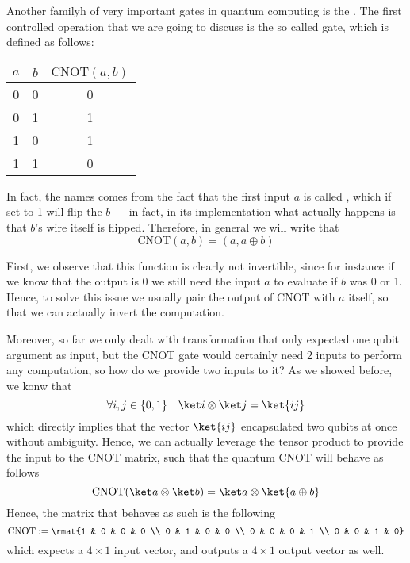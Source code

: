\documentclass[a4paper, 12pt]{report}
\begin{document}
Another familyh of very important gates in quantum computing is the . The first controlled operation that we are going to discuss is the so called  gate, which is defined as follows:

\begin{center}
	\begin{tabular}{cc|c}
		\hline
		$a$ & $b$ & $\mbox{CNOT}(a, b)$ \\
		\hline\hline
		0   & 0   & 0                   \\
		\hline
		0   & 1   & 1                   \\
		\hline
		1   & 0   & 1                   \\
		\hline
		1   & 1   & 0                   \\
		\hline
	\end{tabular}
\end{center}

In fact, the names comes from the fact that the first input $a$ is called , which if set to 1 will flip the  $b$ --- in fact, in its implementation what actually happens is that $b$'s wire itself is flipped. Therefore, in general we will write that $$\mbox{CNOT}(a, b) = (a, a \oplus b)$$

First, we observe that this function is clearly not invertible, since for instance if we know that the output is 0 we still need the input $a$ to evaluate if $b$ was 0 or 1. Hence, to solve this issue we usually pair the output of CNOT with $a$ itself, so that we can actually invert the computation.

Moreover, so far we only dealt with transformation that only expected one qubit argument as input, but the CNOT gate would certainly need 2 inputs to perform any computation, so how do we provide two inputs to it? As we showed before, we konw that $$\forall i, j \in \{0, 1\} \quad \ket i \otimes \ket j = \ket{i j}$$ which directly implies that the vector $\ket{ij}$ encapsulated two qubits at once without ambiguity. Hence, we can actually leverage the tensor product to provide the input to the CNOT matrix, such that the quantum CNOT will behave as follows $$\mbox{CNOT}(\ket a \otimes \ket b) = \ket a \otimes \ket{a \oplus b}$$ Hence, the matrix that behaves as such is the following $$\mbox{CNOT} := \rmat{1 & 0 & 0 & 0 \\ 0 & 1 & 0 & 0 \\ 0 & 0 & 0 & 1 \\ 0 & 0 & 1 & 0}$$ which expects a $4 \times 1$ input vector, and outputs a $4 \times 1$ output vector as well.
\end{document}
